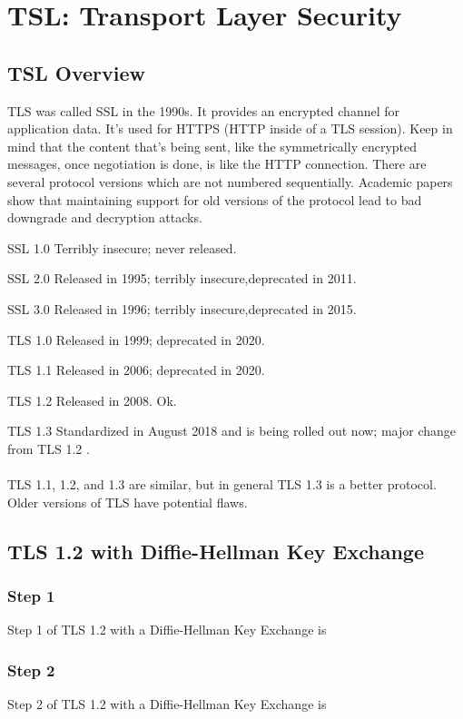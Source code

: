 \documentclass[11pt]{article} %
\begin{document}
\newpage
\section{TSL: Transport Layer Security}

\subsection{TSL Overview}
 TLS was called SSL in the 1990s. It provides an encrypted channel for application data. It's used for HTTPS (HTTP inside of a TLS session). Keep in mind that the content that's being sent, like the symmetrically encrypted messages, once negotiation is done, is like the HTTP connection. There are several protocol versions which are not numbered sequentially. 
Academic papers show that maintaining support for old versions of the protocol lead to bad downgrade and decryption attacks.

\indent SSL 1.0 Terribly insecure; never released.

\indent SSL 2.0 Released in 1995; terribly insecure,deprecated in 2011.

\indent SSL 3.0  Released in 1996; terribly insecure,deprecated in 2015.


\indent TLS 1.0 Released in 1999; deprecated in 2020. 

\indent TLS 1.1 Released in 2006; deprecated in 2020.

\indent TLS 1.2 Released in 2008. Ok.

\indent TLS 1.3 Standardized in August 2018 and is being rolled out now;  major change\\
\indent from TLS 1.2 .
\\~\\
TLS 1.1, 1.2,  and 1.3 are similar, but in general TLS 1.3 is a better protocol. Older versions of TLS have potential flaws.

\newpage
\subsection{TLS 1.2 with Diffie-Hellman Key Exchange}

\subsubsection{Step 1}
Step 1 of TLS 1.2 with a Diffie-Hellman Key Exchange is 

\newpage
\subsubsection{Step 2}
Step 2 of TLS 1.2 with a Diffie-Hellman Key Exchange is 
\end{document}
